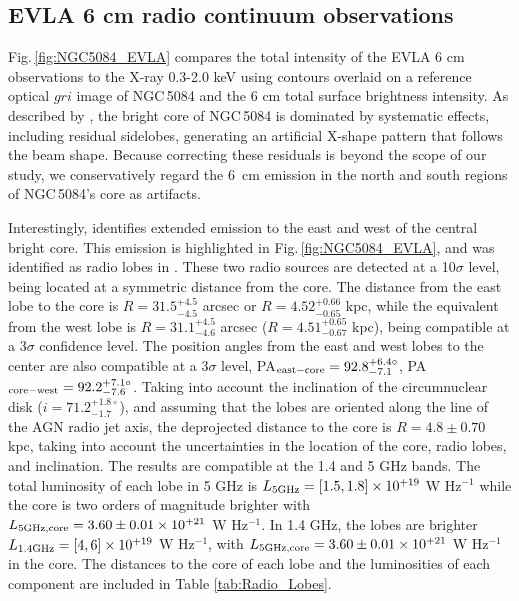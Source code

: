 \documentclass[modern]{CORE-AAS/aastex631}
\begin{document}
{ 
\subsection{EVLA 6 cm radio continuum observations} \label{subsec:results_radiopol}

Fig.\,\ref{fig:NGC5084_EVLA} compares the total intensity of the EVLA 6 cm observations to the X-ray 0.3-2.0 keV using contours overlaid on a reference optical $gri$ image of NGC\,5084 and the 6 cm total surface brightness intensity. As described by \citet{wiegert+2015aj150_81}, the bright core of NGC\,5084 is dominated by systematic effects, including residual sidelobes, generating an artificial X-shape pattern that follows the beam shape. Because correcting these residuals is beyond the scope of our study, we conservatively regard the 6~cm emission in the north and south regions of NGC\,5084's core as artifacts.


Interestingly, \citet{wiegert+2015aj150_81} identifies extended emission to the east and west of the central bright core. This emission is highlighted in Fig.\,\ref{fig:NGC5084_EVLA}, and was identified as radio lobes in \citet[][see their Table 10]{irwin+2019aj158_21}. These two radio sources are detected at a 10$\sigma$ level, being located at a symmetric distance from the core. The distance from the east lobe to the core is $R=31.5^{+4.5}_{-4.5}$ arcsec or $R=4.52^{+0.66}_{-0.65}$ kpc, while the equivalent from the west lobe is $R=31.1^{+4.5}_{-4.6}$ arcsec ($R=4.51^{+0.65}_{-0.67}$ kpc), being compatible at a 3$\sigma$ confidence level. The position angles from the east and west lobes to the center are also compatible at a 3$\sigma$ level, PA$_{\rm east - core} =92.8^{+6.4\circ}_{-7.1}$, PA$_{\rm core - west} =92.2^{+7.1\circ}_{-7.6}$. Taking into account the inclination of the circumnuclear disk ($i=71.2^{+1.8\circ}_{-1.7}$), and assuming that the lobes are oriented along the line of the AGN radio jet axis, the deprojected distance to the core is $R=4.8\pm0.70$ kpc, taking into account the uncertainties in the location of the core, radio lobes, and inclination. The results are compatible at the 1.4 and 5 GHz bands. The total luminosity of each lobe in 5 GHz is $L_{\rm 5 GHz} = [1.5,1.8] \times 10^{+19}$ W Hz$^{-1}$ while the core is two orders of magnitude brighter with $L_{\rm 5 GHz, core} = 3.60\pm0.01 \times 10^{+21}$ W Hz$^{-1}$. In 1.4 GHz, the lobes are brighter $L_{\rm 1.4 GHz} = [4,6] \times 10^{+19}$ W Hz$^{-1}$, with $L_{\rm 5 GHz, core} = 3.60\pm0.01 \times 10^{+21}$ W Hz$^{-1}$ in the core. The distances to the core of each lobe and the luminosities of each component are included in Table \ref{tab:Radio_Lobes}.  

}
\end{document}
